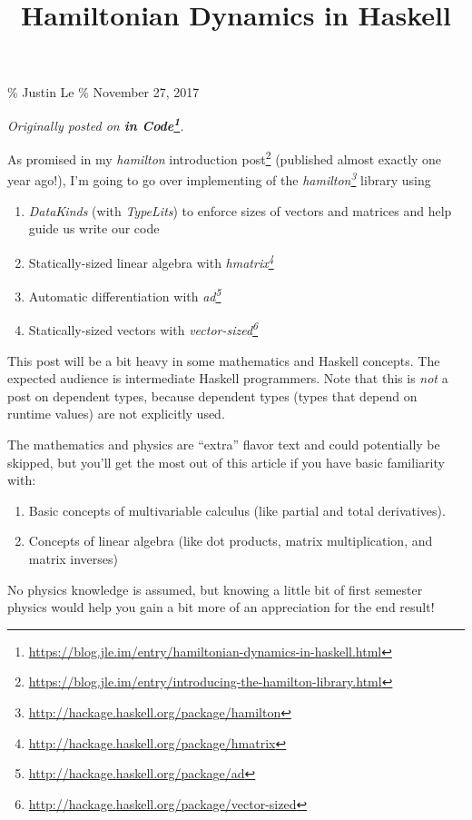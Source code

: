 \documentclass[]{article}
\title{Hamiltonian Dynamics in Haskell}
\renewcommand{\href}[2]{#2\footnote{\url{#1}}}
\begin{document}
\maketitle

\% Justin Le \% November 27, 2017

\emph{Originally posted on
\textbf{\href{https://blog.jle.im/entry/hamiltonian-dynamics-in-haskell.html}{in
Code}}.}

As promised in my
\href{https://blog.jle.im/entry/introducing-the-hamilton-library.html}{\emph{hamilton}
introduction post} (published almost exactly one year ago!), I'm going to go
over implementing of the
\emph{\href{http://hackage.haskell.org/package/hamilton}{hamilton}} library
using

\begin{enumerate}
\def\labelenumi{\arabic{enumi}.}
\tightlist
\item
  \emph{DataKinds} (with \emph{TypeLits}) to enforce sizes of vectors and
  matrices and help guide us write our code
\item
  Statically-sized linear algebra with
  \emph{\href{http://hackage.haskell.org/package/hmatrix}{hmatrix}}
\item
  Automatic differentiation with
  \emph{\href{http://hackage.haskell.org/package/ad}{ad}}
\item
  Statically-sized vectors with
  \emph{\href{http://hackage.haskell.org/package/vector-sized}{vector-sized}}
\end{enumerate}

This post will be a bit heavy in some mathematics and Haskell concepts. The
expected audience is intermediate Haskell programmers. Note that this is
\emph{not} a post on dependent types, because dependent types (types that depend
on runtime values) are not explicitly used.

The mathematics and physics are ``extra'' flavor text and could potentially be
skipped, but you'll get the most out of this article if you have basic
familiarity with:

\begin{enumerate}
\def\labelenumi{\arabic{enumi}.}
\tightlist
\item
  Basic concepts of multivariable calculus (like partial and total derivatives).
\item
  Concepts of linear algebra (like dot products, matrix multiplication, and
  matrix inverses)
\end{enumerate}

No physics knowledge is assumed, but knowing a little bit of first semester
physics would help you gain a bit more of an appreciation for the end result!
\end{document}
